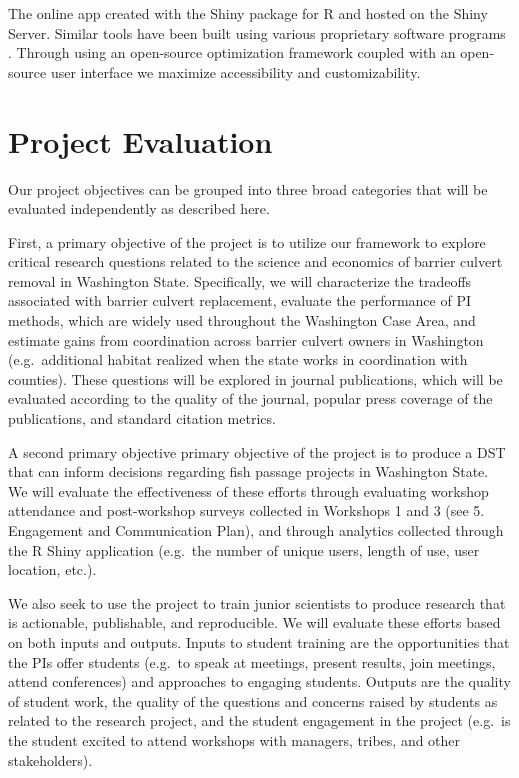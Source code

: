 The online app created with the Shiny package for R and hosted on the Shiny Server. Similar tools have been built using various proprietary software programs \citep{ohanley_optipass_2015, moody_pet_2017, mcmanamay_commonalities_2019}. Through using an open-source optimization framework coupled with an open-source user interface we maximize accessibility and customizability. 


\section{Project Evaluation}

Our project objectives can be grouped into three broad categories that will be evaluated independently as described here. 

First, a primary objective of the project is to utilize our framework to explore critical research questions related to the science and economics of barrier culvert removal in Washington State. Specifically, we will characterize the tradeoffs associated with barrier culvert replacement, evaluate the performance of PI methods, which are widely used throughout the Washington Case Area, and estimate gains from coordination across barrier culvert owners in Washington (e.g.\ additional habitat realized when the state works in coordination with counties). These questions will be explored in journal publications, which will be evaluated according to the quality of the journal, popular press coverage of the publications, and standard citation metrics.


A second primary objective primary objective of the project is to produce a DST that can inform decisions regarding fish passage projects in Washington State.  We will evaluate the effectiveness of these efforts through evaluating workshop attendance and post-workshop surveys collected in Workshops 1 and 3 (see 5. Engagement and Communication Plan), and through analytics collected through the R Shiny application (e.g.\ the number of unique users, length of use, user location, etc.).

We also seek to use the project to train junior scientists to produce research that is actionable, publishable, and reproducible. We will evaluate these efforts based on both inputs and outputs. Inputs to student training are the opportunities that the PIs offer students (e.g.\ to speak at meetings, present results, join meetings, attend conferences) and approaches to engaging students. Outputs are the quality of student work, the quality of the questions and concerns raised by students as related to the research project, and the student engagement in the project (e.g.\ is the student excited to attend workshops with managers, tribes, and other stakeholders). 

